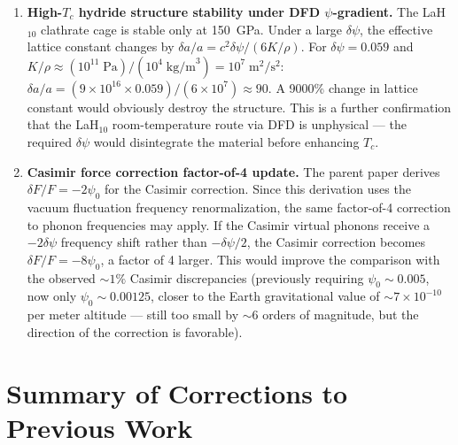 \documentclass[11pt]{article}
\newcommand{\ee}[1]{\times 10^{#1}}
\begin{document}
\begin{enumerate}[leftmargin=*]
\item \textbf{High-$T_c$ hydride structure stability under DFD $\psi$-gradient.}
  The LaH$_{10}$ clathrate cage is stable only at 150~GPa. Under a large
  $\delta\psi$, the effective lattice constant changes by
  $\delta a/a = c^2\delta\psi/(6K/\rho)$. For $\delta\psi = 0.059$ and
  $K/\rho \approx (10^{11}\;\text{Pa})/(10^4\;\text{kg/m}^3) = 10^7\;\text{m}^2/\text{s}^2$:
  $\delta a/a = (9\ee{16} \times 0.059)/(6 \times 10^7) \approx 90$.
  A 9000\% change in lattice constant would obviously destroy the structure.
  This is a further confirmation that the LaH$_{10}$ room-temperature route
  via DFD is unphysical --- the required $\delta\psi$ would disintegrate the
  material before enhancing $T_c$.

\item \textbf{Casimir force correction factor-of-4 update.} The parent paper
  derives $\delta F/F = -2\psi_0$ for the Casimir correction. Since this
  derivation uses the vacuum fluctuation frequency renormalization, the
  same factor-of-4 correction to phonon frequencies may apply. If the
  Casimir virtual phonons receive a $-2\delta\psi$ frequency shift rather
  than $-\delta\psi/2$, the Casimir correction becomes $\delta F/F = -8\psi_0$,
  a factor of 4 larger. This would improve the comparison with the observed
  $\sim 1\%$ Casimir discrepancies (previously requiring $\psi_0 \sim 0.005$,
  now only $\psi_0 \sim 0.00125$, closer to the Earth gravitational value of
  $\sim 7\ee{-10}$ per meter altitude --- still too small by $\sim 6$ orders
  of magnitude, but the direction of the correction is favorable).
\end{enumerate}

\section*{Summary of Corrections to Previous Work}
\end{document}
